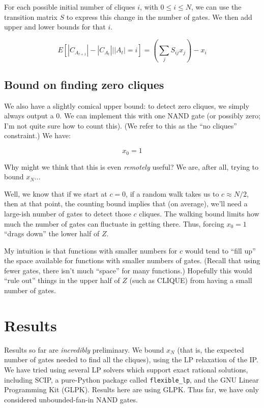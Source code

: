 \documentclass[12pt]{article}
\theoremstyle{definition}
\begin{document}
For each possible initial number of cliques $i$, with $0 \le i \le N$,
we can use the transition matrix $S$ to express this change in the
number of gates. We then add upper and lower bounds for that $i$.

\[
E[ |C_{A_{t+1}}| - |C_{A_t}| | |A_t|=i ] = (\sum_j S_{ij} x_j) - x_i
\]

\subsection{Bound on finding zero cliques}

We also have a slightly comical upper bound:
to detect zero cliques, we simply always
output a 0. We can implement this with one NAND gate (or possibly zero;
I'm not quite sure how to count this). (We refer to this as the
``no cliques'' constraint.) We have:

\[
x_0 = 1
\]

Why might we think that this is even {\em remotely} useful? We are, after
all, trying to bound $x_N$...

Well, we know that if we start at $c=0$, if a random walk takes us to
$c \approx N/2$, then at that point, the counting bound implies that
(on average), we'll need a large-ish number of gates to detect those $c$ cliques.
The walking bound limits how much the number of gates can fluctuate
in getting there. Thus, forcing $x_0=1$ ``drags down'' the lower half of $Z$.

My intuition is that functions with smaller numbers for $c$ would
tend to ``fill up'' the space available for functions with smaller numbers of gates.
(Recall that using fewer gates, there isn't much ``space'' for many functions.)
Hopefully this would ``rule out'' things in the upper half of $Z$ (such as CLIQUE)
from having a small number of gates.

\section{Results}

Results so far are {\em incredibly} preliminary. We bound $x_N$
(that is, the expected number of gates needed to find all the cliques),
using the LP relaxation of the IP. We have tried using several
LP solvers which support exact rational solutions,
including SCIP, a pure-Python package called {\tt flexible\_lp},
and the GNU Linear Programming Kit (GLPK). Results here are
using GLPK. Thus far, we have only considered unbounded-fan-in
NAND gates.
\end{document}
